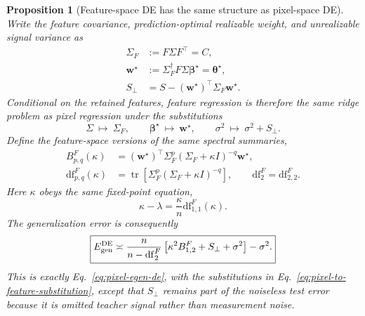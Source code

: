 \documentclass[11pt]{article}
\newtheorem{proposition}[theorem]{Proposition}
\newcommand{\tr}{\operatorname{tr}}
\newcommand{\bstar}{\bm\beta^{\star}}
\newcommand{\tstar}{\bm\theta^{\star}}
\begin{document}
\begin{proposition}[Feature-space DE has the same structure as pixel-space DE]
\label{prop:feature-de}
Write the feature covariance, prediction-optimal realizable weight, and
unrealizable signal variance as
\begin{align}
  \Sigma_F&:=F\Sigma F^{\top}=C,\\
  \bm w^{\star}&:=\Sigma_F^{\dagger}F\Sigma\bstar=\tstar,\\
  S_{\perp}&=S-(\bm w^{\star})^{\top}\Sigma_F\bm w^{\star}.
  \label{eq:feature-effective-problem}
\end{align}
Conditional on the retained features, feature regression is therefore the
same ridge problem as pixel regression under the substitutions
\begin{equation}
  \boxed{
  \Sigma\ \longmapsto\ \Sigma_F,
  \qquad
  \bstar\ \longmapsto\ \bm w^{\star},
  \qquad
  \sigma^2\ \longmapsto\ \sigma^2+S_{\perp}.}
  \label{eq:pixel-to-feature-substitution}
\end{equation}
Define the feature-space versions of the same spectral summaries,
\begin{align}
  B^{F}_{p,q}(\kappa)
    &=(\bm w^{\star})^{\top}
      \Sigma_F^{p}(\Sigma_F+\kappa I)^{-q}\bm w^{\star},\\
  \mathrm{df}^{F}_{p,q}(\kappa)
    &=\tr\!\left[
      \Sigma_F^{p}(\Sigma_F+\kappa I)^{-q}\right],
  \qquad
  \mathrm{df}^{F}_{2}=\mathrm{df}^{F}_{2,2}.
  \label{eq:feature-B-df}
\end{align}
Here $\kappa$ obeys the same fixed-point equation,
\begin{equation}
  \kappa-\lambda
  =\frac{\kappa}{n}\mathrm{df}^{F}_{1,1}(\kappa).
  \label{eq:feature-kappa-fixed-point}
\end{equation}
The generalization error is consequently
\begin{equation}
  \boxed{
  E_{\rm gen}^{\rm DE}
  \asymp
  \frac{n}{n-\mathrm{df}^{F}_{2}}
  \left[
    \kappa^2B^{F}_{1,2}
    +S_{\perp}+\sigma^2
  \right]-\sigma^2.}
  \label{eq:feature-egen-de}
\end{equation}
This is exactly Eq.~\eqref{eq:pixel-egen-de}, with the substitutions in
Eq.~\eqref{eq:pixel-to-feature-substitution}, except that $S_{\perp}$ remains
part of the noiseless test error because it is omitted teacher signal rather
than measurement noise.


\end{proposition}
\end{document}
